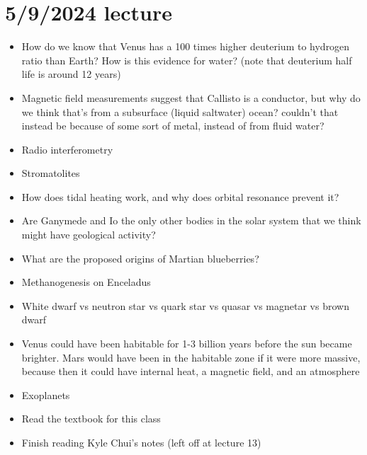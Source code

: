 \documentclass[class=article, crop=false]{standalone}
\begin{document}
\section{5/9/2024 lecture}
\begin{itemize}
    \item How do we know that Venus has a 100 times higher deuterium to hydrogen ratio than Earth? How is this evidence for water? (note that deuterium half life is around 12 years)
    \item Magnetic field measurements suggest that Callisto is a conductor, but why do we think that's from a subsurface (liquid saltwater) ocean? couldn't that instead be because of some sort of metal, instead of from fluid water?
    \item Radio interferometry
    \item Stromatolites
    \item How does tidal heating work, and why does orbital resonance prevent it?
    \item Are Ganymede and Io the only other bodies in the solar system that we think might have geological activity?
    \item What are the proposed origins of Martian blueberries?
    \item Methanogenesis on Enceladus
    \item White dwarf vs neutron star vs quark star vs quasar vs magnetar vs brown dwarf
    \item Venus could have been habitable for 1-3 billion years before the sun became brighter. Mars would have been in the habitable zone if it were more massive, because then it could have internal heat, a magnetic field, and an atmosphere
    \item Exoplanets
    \item Read the textbook for this class
    \item Finish reading Kyle Chui's notes (left off at lecture 13)
\end{itemize}
\end{document}
